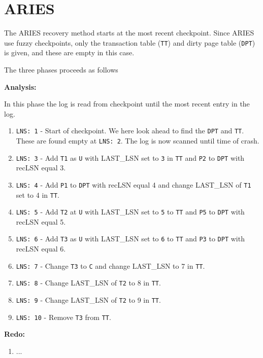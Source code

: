 
\section{ARIES}

The ARIES recovery method starts at the most recent checkpoint. Since ARIES
use fuzzy checkpoints, only the transaction table ({\tt TT}) and dirty page
table ({\tt DPT}) is given, and these are empty in this case.

\noindent
The three phases proceeds as follows

\noindent
{\bf Analysis:}

In this phase the log is read from checkpoint until the most recent entry in
the log.
\begin{enumerate}
\item {\tt LNS: 1} - Start of checkpoint. We here look ahead to find the
{\tt DPT} and {\tt TT}. These are found empty at {\tt LNS: 2}. The log is now
scanned until time of crash.
\item {\tt LNS: 3} - Add {\tt T1} as {\tt U} with LAST\_LSN set to {\tt 3} in {\tt TT} and {\tt P2} to {\tt DPT} with recLSN equal 3.
\item {\tt LNS: 4} - Add {\tt P1} to {\tt DPT} with recLSN equal 4 and change LAST\_LSN of
    {\tt T1} set to 4 in {\tt TT}.
\item {\tt LNS: 5} - Add {\tt T2} at {\tt U} with LAST\_LSN set to {\tt 5}
    to {\tt TT} and {\tt P5} to {\tt DPT} with recLSN equal 5.
\item {\tt LNS: 6} - Add {\tt T3} as {\tt U} with LAST\_LSN set to {\tt 6}
    to {\tt TT} and {\tt P3} to {\tt DPT}  with recLSN equal 6.
\item {\tt LNS: 7} - Change {\tt T3} to {\tt C} and change LAST\_LSN to 7 in {\tt TT}.
\item {\tt LNS: 8} - Change LAST\_LSN of {\tt T2} to 8 in {\tt TT}.
\item {\tt LNS: 9} - Change LAST\_LSN of {\tt T2} to 9 in {\tt TT}.
\item {\tt LNS: 10} - Remove {\tt T3} from {\tt TT}.
\end{enumerate}

\noindent
{\bf Redo:}

\begin{enumerate}
\item ...
\end{enumerate}


